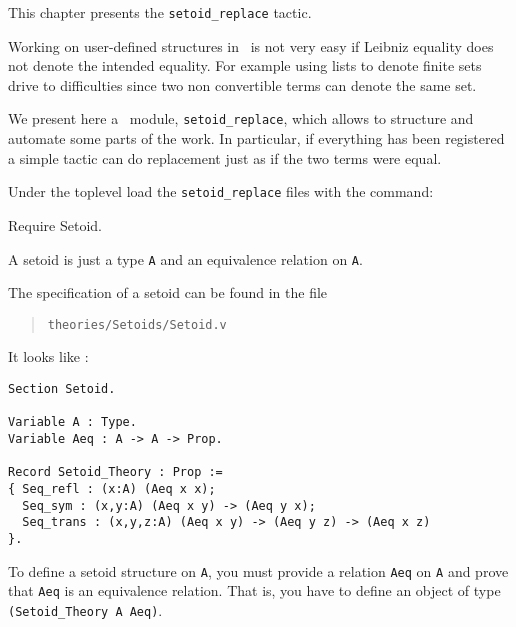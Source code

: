 \label{setoid_replace}

This chapter presents  the \texttt{setoid\_replace} tactic.


Working on user-defined structures in \Coq\ is not very easy if
Leibniz equality does not denote the intended equality. For example
using lists to denote finite sets drive to difficulties since two
non convertible terms can denote the same set.

We present here a \Coq\ module, {\tt setoid\_replace}, which allows to
structure and automate some parts of the work. In particular, if
everything has been registered a simple
tactic can do replacement just as if the two terms were equal.


Under the toplevel
load the \texttt{setoid\_replace} files with the command:

\begin{coq_example*}
  Require Setoid.
\end{coq_example*}

A setoid is just a type \verb+A+ and an equivalence relation on \verb+A+.

The specification of a setoid can be found in the file

\begin{quotation}
\begin{verbatim}
theories/Setoids/Setoid.v
\end{verbatim}
\end{quotation}

It looks like :
\begin{small}
\begin{flushleft}
\begin{verbatim}
Section Setoid.

Variable A : Type.
Variable Aeq : A -> A -> Prop.

Record Setoid_Theory : Prop :=
{ Seq_refl : (x:A) (Aeq x x);
  Seq_sym : (x,y:A) (Aeq x y) -> (Aeq y x);
  Seq_trans : (x,y,z:A) (Aeq x y) -> (Aeq y z) -> (Aeq x z)
}.
\end{verbatim}
\end{flushleft}
\end{small}

To define a setoid structure on \verb+A+, you must provide a relation
\verb|Aeq| on \verb+A+ and prove that \verb|Aeq| is an equivalence
relation. That is, you have to define an object of type
\verb|(Setoid_Theory A Aeq)|.

